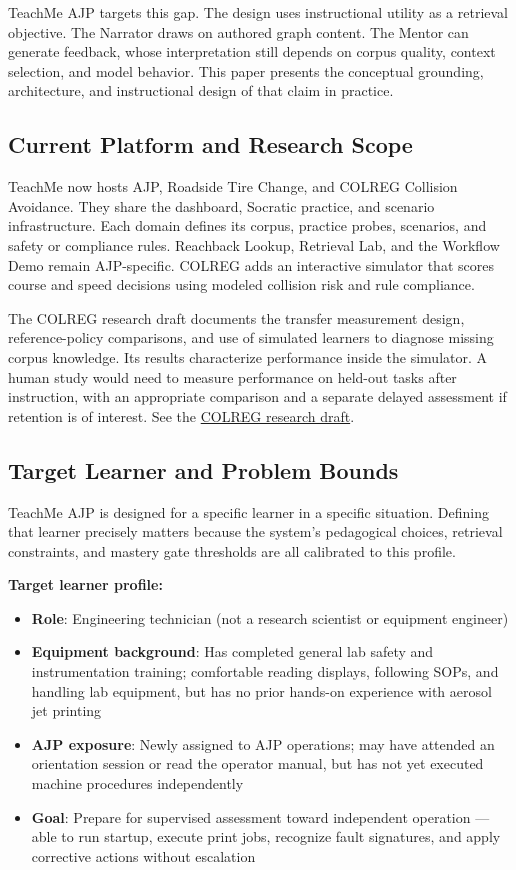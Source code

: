 \documentclass[10pt,letterpaper,twocolumn]{article}
\begin{document}
TeachMe AJP targets this gap. The design uses instructional utility as a retrieval objective. The Narrator draws on authored graph content. The Mentor can generate feedback, whose interpretation still depends on corpus quality, context selection, and model behavior. This paper presents the conceptual grounding, architecture, and instructional design of that claim in practice.

\subsection{Current Platform and Research Scope}
TeachMe now hosts AJP, Roadside Tire Change, and COLREG Collision Avoidance. They share the dashboard, Socratic practice, and scenario infrastructure. Each domain defines its corpus, practice probes, scenarios, and safety or compliance rules. Reachback Lookup, Retrieval Lab, and the Workflow Demo remain AJP-specific. COLREG adds an interactive simulator that scores course and speed decisions using modeled collision risk and rule compliance.

The COLREG research draft documents the transfer measurement design, reference-policy comparisons, and use of simulated learners to diagnose missing corpus knowledge. Its results characterize performance inside the simulator. A human study would need to measure performance on held-out tasks after instruction, with an appropriate comparison and a separate delayed assessment if retention is of interest.
See the \href{https://github.com/wrgr/socratic-scenarios/blob/main/docs/planning/colreg-whitepaper.md}{COLREG research draft}.

\subsection{Target Learner and Problem Bounds}
\label{sec:target-learner}

TeachMe AJP is designed for a specific learner in a specific situation. Defining that learner precisely matters because the system's pedagogical choices, retrieval constraints, and mastery gate thresholds are all calibrated to this profile.

\textbf{Target learner profile:}
\begin{itemize}
  \item \textbf{Role}: Engineering technician (not a research scientist or equipment engineer)
  \item \textbf{Equipment background}: Has completed general lab safety and instrumentation training; comfortable reading displays, following SOPs, and handling lab equipment, but has no prior hands-on experience with aerosol jet printing
  \item \textbf{AJP exposure}: Newly assigned to AJP operations; may have attended an orientation session or read the operator manual, but has not yet executed machine procedures independently
  \item \textbf{Goal}: Prepare for supervised assessment toward independent operation --- able to run startup, execute print jobs, recognize fault signatures, and apply corrective actions without escalation
\end{itemize}
\end{document}
